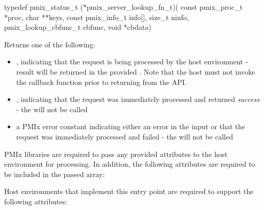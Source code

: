 \format

\cspecificstart
\begin{codepar}
typedef pmix_status_t (*pmix_server_lookup_fn_t)(
                             const pmix_proc_t *proc,
                             char **keys,
                             const pmix_info_t info[],
                             size_t ninfo,
                             pmix_lookup_cbfunc_t cbfunc,
                             void *cbdata)
\end{codepar}
\cspecificend

\begin{arglist}
\end{arglist}

Returns one of the following:

\begin{itemize}
    \item {}, indicating that the request is being processed by the host environment - result will be returned in the provided . Note that the host must not invoke the callback function prior to returning from the \ac{API}.
    \item {}, indicating that the request was immediately processed and returned \textit{success} - the  will not be called
    \item a PMIx error constant indicating either an error in the input or that the request was immediately processed and failed - the  will not be called
\end{itemize}

\reqattrstart
\ac{PMIx} libraries are required to pass any provided attributes to the host environment for processing. In addition, the following attributes are required to be included in the passed  array:


\divider

Host environments that implement this entry point are required to support the following attributes:


